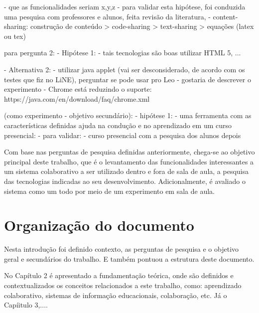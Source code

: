                         - que as funcionalidades seriam x,y,z
                            - para validar esta hipótese, foi conduzida uma pesquisa com professores e alunos, feita revisão da literatura, 
                        - content-sharing: construção de conteúdo > code-sharing > text-sharing > equações (latex ou tex)

                    para pergunta 2:
                        - Hipótese 1:
                            - tais tecnologias são boas utilizar HTML 5, ...

                            - Alternativa 2:
                                - utilizar java applet (vai ser desconsiderado, de acordo com os testes que fiz no LiNE), perguntar se pode usar pro Leo - gostaria de descrever o experimento
                                - Chrome está reduzindo o suporte:
                                    https://java.com/en/download/faq/chrome.xml

                    (como experimento - objetivo secundário):
                        - hipótese 1:
                            - uma ferramenta com as características definidas ajuda na condução e no aprendizado em um curso presencial:
                            - para validar:
                                - curso presencial com a pesquisa dos alunos depois





Com base nas perguntas de pesquisa definidas anteriormente, chega-se ao objetivo principal deste trabalho, que é o levantamento das funcionalidades interessantes a um sistema colaborativo a ser utilizado dentro e fora de sala de aula, a pesquisa das tecnologias indicadas ao seu desenvolvimento. Adicionalmente, é avaliado o sistema como um todo por meio de um experimento em sala de aula.

\section{Organização do documento}

Nesta introdução foi definido contexto, as perguntas de pesquisa e o objetivo geral e secundários do trabalho. E também pontuou a estrutura deste documento.

No Capítulo 2 é apresentado a fundamentação teórica, onde são definidos e contextualizados os conceitos relacionados a este trabalho, como: aprendizado colaborativo, sistemas de informação educacionais, colaboração, etc. Já o Capíitulo 3,....

